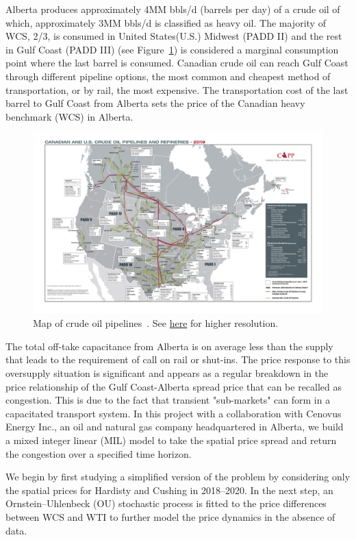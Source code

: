 \documentclass[11pt]{m2pi}
\begin{document}
Alberta produces approximately 4MM bbls/d (barrels per day) of a crude oil of which, approximately 3MM bbls/d is classified as heavy oil. The majority of WCS, 2/3, is consumed in United States(U.S.) Midwest (PADD II) and the rest in Gulf Coast (PADD III) (see Figure~\ref{fig:PADD Map}) is considered a marginal consumption point where the last barrel is consumed. Canadian crude oil can reach Gulf Coast through different pipeline options, the most common and cheapest method of transportation, or by rail, the most expensive. The transportation cost of the last barrel to Gulf Coast from Alberta sets the price of the Canadian heavy benchmark (WCS) in Alberta.
\begin{figure}
    \centering
    \includegraphics[width = \linewidth]{pipemap.png}
    \caption{Map of crude oil pipelines~\cite{pipelineMap}. See \href{https://www.capp.ca/explore/oil-and-natural-gas-pipelines}{{\color{blue}here}} for higher resolution.}
    \label{fig:PADD Map}
\end{figure}

The total off-take capacitance from Alberta is on average less than the supply that leads to the requirement of call on rail or shut-ins. The price response to this oversupply situation is significant and appears as a regular breakdown in the price relationship of the Gulf Coast-Alberta spread price that can be recalled as congestion. This is due to the fact that transient "sub-markets" can form in a capacitated transport system.
In this project with a collaboration with Cenovus Energy Inc., an oil and natural gas company headquartered in Alberta, we build a mixed integer linear (MIL) model to take the spatial price spread and return the congestion over a specified time horizon.

We begin by first studying a simplified version of the problem by considering only the spatial prices for Hardisty and Cushing in 2018--2020. In the next step, an Ornstein--Uhlenbeck (OU) stochastic process is fitted to the price differences between WCS and WTI to further model the price dynamics in the absence of data.
\end{document}
